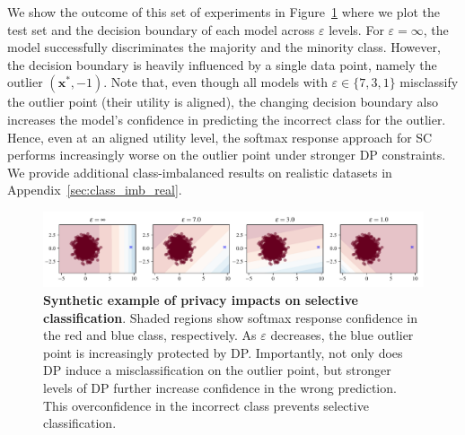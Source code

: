 We show the outcome of this set of experiments in Figure~\ref{fig:eps_gauss} where we plot the test set and the decision boundary of each model across $\varepsilon$ levels. For $\varepsilon = \infty$, the model 
successfully discriminates the majority and the minority class. However, the decision boundary is heavily influenced by a single data point, namely the outlier $(\bm{x}^*,-1)$. 
Note that, even though all models with $\varepsilon \in \{7,3,1\}$ misclassify the outlier point (\ie their utility is aligned), the changing decision boundary also increases the model's confidence in predicting the incorrect class for the outlier. Hence, even at an aligned utility level, the softmax response approach for SC performs increasingly worse on the outlier point under stronger DP constraints. We provide additional class-imbalanced results on realistic datasets in Appendix~\ref{sec:class_imb_real}.

\begin{figure}[t]
  \centering
  \includegraphics[width=\linewidth]{figs/sptd_dp/eps_gauss.pdf}
\caption[Synthetic example of privacy impacts on selective classification.]{\textbf{Synthetic example of privacy impacts on selective classification}. Shaded regions show softmax response confidence in the red and blue class, respectively. As $\varepsilon$ decreases, the blue outlier point is increasingly protected by DP. Importantly, not only does DP induce a misclassification on the outlier point, but stronger levels of DP further increase confidence in the wrong prediction. This overconfidence in the incorrect class prevents selective classification.}
\label{fig:eps_gauss}
\end{figure}

